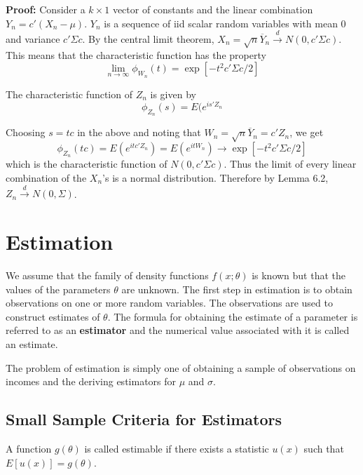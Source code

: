\documentclass{article}
\begin{document}
\textbf{Proof:} Consider a \(k \times 1\) vector of constants and the linear combination \(Y_n=c'(X_n-\mu)\). \(Y_n\) is a sequence of iid scalar random variables with mean 0 and variance \(c' \Sigma c\). By the central limit theorem, \(X_n=\sqrt{n}\overline{Y}_n \stackrel{d} \longrightarrow N(0,c'\Sigma c)\). This means that the characteristic function has the property
\begin{equation*}
    \lim_{n \rightarrow \infty} \phi_{W_n}(t)=\exp[-t^2c' \Sigma c/2]
\end{equation*}

The characteristic function of \(Z_n\) is given by
\begin{equation*}
    \phi_{Z_n}(s)=E(e^{is'Z_n}
\end{equation*}

Choosing \(s=tc\) in the above and noting that \(W_n=\sqrt{n} \overline{Y}_n=c'Z_n\), we get
\begin{equation*}
    \phi_{Z_n}(tc)=E(e^{itc'Z_n})=E(e^{itW_n}) \rightarrow \exp[-t^2 c' \Sigma c/2]
\end{equation*}
which is the characteristic function of \(N(0,c'\Sigma c)\). Thus the limit of every linear combination of the \(X_n\)'s is a normal distribution. Therefore by Lemma 6.2, \(Z_n \stackrel{d} \longrightarrow N(0,\Sigma)\).

\section{Estimation}

We assume that the family of density functions \(f(x;\theta)\) is known but that the values of the parameters \(\theta\) are unknown. The first step in estimation is to obtain observations on one or more random variables. The observations are used to construct estimates of $\theta$. The formula for obtaining the estimate of a parameter is referred to as an \textbf{estimator} and the numerical value associated with it is called an estimate.

The problem of estimation is simply one of obtaining a sample of observations on incomes and the deriving estimators for $\mu$ and $\sigma$. 

\subsection{Small Sample Criteria for Estimators}

A function \(g(\theta)\) is called estimable if there exists a statistic \(u(x)\) such that \(E[u(x)]=g(\theta)\).
\end{document}

